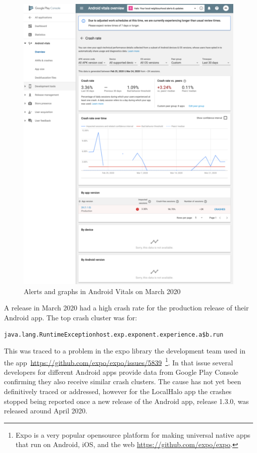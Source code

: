 \begin{figure}[htbp!]
\begin{minipage}{.45\textwidth}
  \includegraphics[width=\textwidth]{images/localhalo/apphealthdetailsplace_55505963_high_errors.png}
\end{minipage}
    \caption{Alerts and graphs in Android Vitals on  March 2020}
    \label{fig:localhalo-android-vitals-high-failures-26-march-2020}
\end{figure}
A release in March 2020 had a high crash rate for the production release of their Android app. The top crash cluster was for:

{\small \texttt{java.lang.RuntimeExceptionhost.exp.exponent.experience.a\$b.run}} 

This was traced to a problem in the expo library the development team used in the app~\url{https://github.com/expo/expo/issues/5839}~\footnote{Expo is a very popular opensource platform for making universal native apps that run on Android, iOS, and the web \url{https://github.com/expo/expo}.}. In that issue several developers for different Android apps provide data from Google Play Console confirming they also receive similar crash clusters. The cause has not yet been definitively traced or addressed, however for the LocalHalo app the crashes stopped being reported once a new release of the Android app, release 1.3.0, was released around  April 2020.

